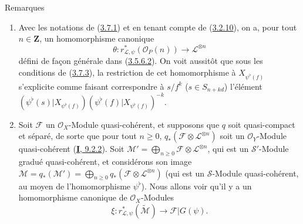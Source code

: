 \begin{namedtheorem}[3.7.9]{Remarques}
\label{II.3.7.9-fr}
\begin{enumerate}
  \item[(i)] Avec les notations de (\hyperref[II.3.7.1-fr]{3.7.1}) et en
    tenant compte de (\hyperref[II.3.2.10-fr]{3.2.10}), on a, pour tout
    $n\in\mathbf{Z}$, un homomorphisme canonique
    \[
    \label{II.3.7.9.1-fr}
      \theta:r_{\mathcal{L},\psi}^*(\mathcal{O}_P(n))\longrightarrow
      \mathcal{L}^{\otimes n}
    \tag{3.7.9.1}
    \]
    défini de façon générale dans
    (\hyperref[II.3.5.6.2-fr]{3.5.6.2}). On voit aussitôt que sous les
    conditions de (\hyperref[II.3.7.3-fr]{3.7.3}), la restriction de cet
    homomorphisme à $X_{\psi^\flat(f)}$ s'explicite comme faisant
    correspondre à $s/f^k$ ($s\in S_{n+kd}$) l'élément
    $(\psi^\flat(s)|X_{\psi^\flat(f)})
    (\psi^\flat(f)|X_{\psi^\flat(f)})^{-k}$.
  \item[(ii)] Soit $\mathcal{F}$ un $\mathcal{O}_X$-Module quasi-cohérent, et
    supposons que $q$ soit quasi-compact et séparé, de sorte que pour tout
    $n\geq0$, $q_*(\mathcal{F}\otimes\mathcal{L}^{\otimes n})$ soit un
    $\mathcal{O}_Y$-Module quasi-cohérent
    (\hyperref[I.9.2.2-fr]{\textbf{I}, 9.2.2}). Soit
    $\mathcal{M}'=\bigoplus_{n\geq0}\mathcal{F}\otimes
    \mathcal{L}^{\otimes n}$, qui est un $\mathcal{S}'$-Module gradué
    quasi-cohérent, et considérons son image
    $\mathcal{M}=q_*(\mathcal{M}')=
    \bigoplus_{n\geq0}q_*(\mathcal{F}\otimes\mathcal{L}^{\otimes n})$
    (qui est un $\mathcal{S}$-Module quasi-cohérent, au moyen de
    l'homomorphisme $\psi^\flat$). Nous allons voir qu'il y a un
    homomorphisme canonique de $\mathcal{O}_X$-Modules
    \[
    \label{II.3.7.9.2-fr}
      \xi:r_{\mathcal{L},\psi}^*(\widetilde{\mathcal{M}})
      \longrightarrow\mathcal{F}|G(\psi).
    \tag{3.7.9.2}
    \]


\end{enumerate}
\end{namedtheorem}

